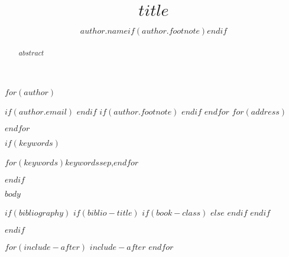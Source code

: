\documentclass[$for(classoption)$$classoption$$sep$,$endfor$]{elsarticle}
\begin{document}
\begin{frontmatter}

  \title{$title$}
  
  $for(author)$
  \author[$author.affiliation$]{$author.name$$if(author.footnote)$$endif$}
  $if(author.email)$  $endif$
  $if(author.footnote)$ $endif$
  $endfor$
  $for(address)$
  \address[$address.code$]{$address.address$}
  $endfor$

  \begin{abstract}
  $abstract$
  \end{abstract}
  $if(keywords)$ \begin{keyword} $for(keywords)$$keywords$$sep$,$endfor$\end{keyword}$endif$

\end{frontmatter}

$body$


$if(bibliography)$
$if(biblio-title)$
$if(book-class)$
\renewcommand\bibname{$biblio-title$}
$else$
\renewcommand\refname{$biblio-title$}
$endif$
$endif$

$endif$

$for(include-after)$
$include-after$
$endfor$
\end{document}
